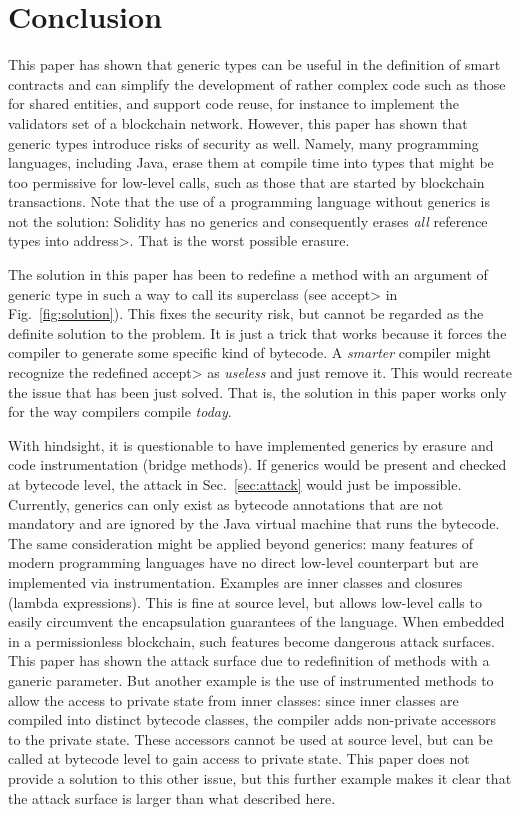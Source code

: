 \section{Conclusion}\label{sec:conclusion} 

This paper has shown that generic types can be useful in the definition
of smart contracts and can simplify the development of rather complex
code such as those for shared entities, and support code reuse, for
instance to implement the validators set of a blockchain network.
However, this paper has shown that generic types
introduce risks of security as well.
Namely, many
programming languages, including Java, erase them at compile time
into types that might be too permissive for low-level calls, such as
those that are started by blockchain transactions. Note that the use of a programming
language without generics is not the solution: Solidity has no generics
and consequently erases \emph{all} reference types into \<address>.
That is the worst possible erasure.

The solution in this paper has been to redefine a method with an argument
of generic type in such a way to call its superclass
(see \<accept> in Fig.~\ref{fig:solution}). This fixes the security risk,
but cannot be regarded as the definite solution to the problem. It is just a trick that
works because it forces the compiler to generate some specific kind of bytecode.
A \emph{smarter} compiler might recognize the redefined \<accept> as
\emph{useless} and just remove it. This would recreate the issue that
has been just solved. That is, the solution in this paper works only for the way
compilers compile \emph{today}.

With hindsight, it is questionable to have implemented generics by erasure
and code instrumentation (bridge methods). If generics would be present
and checked at bytecode level, the attack in Sec.~\ref{sec:attack} would just
be impossible. Currently, generics can only exist as bytecode annotations
that are not mandatory and are ignored by the Java virtual machine
that runs the bytecode. The same consideration might be applied beyond
generics: many features of modern programming
languages have no direct low-level
counterpart but are implemented via instrumentation. Examples are
inner classes and closures (lambda expressions). This is fine at source level, but allows
low-level calls to easily circumvent
the encapsulation guarantees of the language. When embedded in a permissionless
blockchain, such features become dangerous attack surfaces. This paper has shown
the attack surface due to redefinition of methods with a ganeric parameter.
But another example is the use of instrumented methods to allow the access to
private state from inner classes: since inner classes are compiled into distinct
bytecode classes, the compiler adds non-private accessors to the
private state. These accessors cannot be used
at source level, but can be called at bytecode level to gain access to private state.
This paper does not provide a solution to this other issue, but this further example
makes it clear that the attack surface is larger than what described here.
